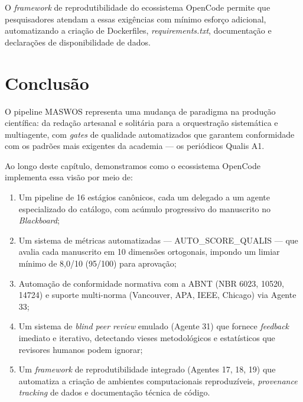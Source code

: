 O \textit{framework} de reprodutibilidade do ecossistema OpenCode
permite que pesquisadores atendam a essas exigências com mínimo
esforço adicional, automatizando a criação de Dockerfiles,
\textit{requirements.txt}, documentação e declarações de
disponibilidade de dados.

\section{Conclusão}
\label{sec:conclusao_capitulo}

O pipeline MASWOS representa uma mudança de paradigma na produção
científica: da redação artesanal e solitária para a orquestração
sistemática e multiagente, com \textit{gates} de qualidade
automatizados que garantem conformidade com os padrões mais
exigentes da academia — os periódicos Qualis A1.

Ao longo deste capítulo, demonstramos como o ecossistema OpenCode
implementa essa visão por meio de:

\begin{enumerate}
    \item Um pipeline de 16 estágios canônicos, cada um delegado a
    um agente especializado do catálogo, com acúmulo progressivo
    do manuscrito no \textit{Blackboard};

    \item Um sistema de métricas automatizadas — AUTO\_SCORE\_QUALIS
    — que avalia cada manuscrito em 10 dimensões ortogonais,
    impondo um limiar mínimo de 8,0/10 (95/100) para aprovação;

    \item Automação de conformidade normativa com a ABNT (NBR 6023,
    10520, 14724) e suporte multi-norma (Vancouver, APA, IEEE,
    Chicago) via Agente 33;

    \item Um sistema de \textit{blind peer review} emulado (Agente
    31) que fornece \textit{feedback} imediato e iterativo,
    detectando vieses metodológicos e estatísticos que revisores
    humanos podem ignorar;

    \item Um \textit{framework} de reprodutibilidade integrado
    (Agentes 17, 18, 19) que automatiza a criação de ambientes
    computacionais reproduzíveis, \textit{provenance tracking} de
    dados e documentação técnica de código.
\end{enumerate}

